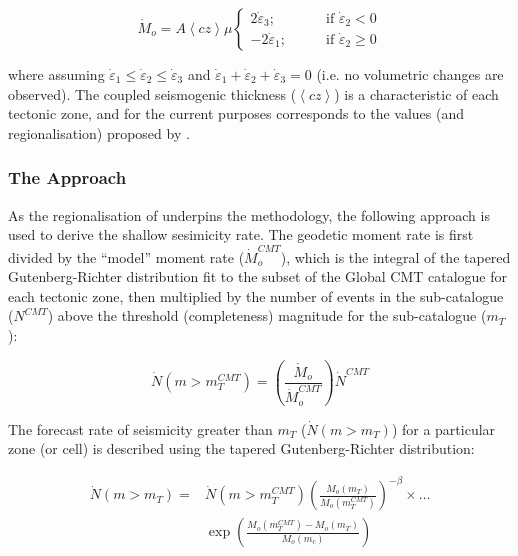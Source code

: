  \begin{equation}
     \dot{M}_o = A \left\langle {cz} \right\rangle \mu \left\{
     \begin{array}{rl}
          2 \dot{\varepsilon}_3;& \qquad \text{if } \dot{\varepsilon}_2 < 0 \\
         -2 \dot{\varepsilon}_1;& \qquad \text{if } \dot{\varepsilon}_2 \geq 0 
     \end{array}
     \right.
 \end{equation}
 
 where assuming $\dot{\varepsilon}_1 \leq \dot{\varepsilon}_2 \leq \dot{\varepsilon}_3$ and $\dot{\varepsilon}_1 + \dot{\varepsilon}_2 + \dot{\varepsilon}_3 = 0$ (i.e. no volumetric changes are observed). The coupled seismogenic thickness ($\left\langle cz \right\rangle$) is a characteristic of each tectonic zone, and for the current purposes corresponds to the values (and regionalisation) proposed by \cite{BirdKagan2004}. 
 
 \subsubsection{The \cite{BirdLiu2007} Approach}
 
 As the regionalisation of \citet{BirdKagan2004} underpins the \cite{BirdLiu2007} methodology, the following approach is used to derive the shallow sesimicity rate. The geodetic moment rate  is first divided by the ``model'' moment rate ($\dot{M}_o^{CMT}$), which is the integral of the tapered Gutenberg-Richter distribution fit to the subset of the Global CMT catalogue for each tectonic zone, then multiplied by the number of events in the sub-catalogue ($N^{CMT}$) above the threshold (completeness) magnitude for the sub-catalogue ($m_T$):
 
 \begin{equation}
 \dot{N} \left( {m > m_T^{CMT}} \right) = \left( {\frac{\dot{M}_o}{\dot{M}_o^{CMT}}} \right) \dot{N}^{CMT}
 \end{equation}

The forecast rate of seismicity greater than $m_T$ ($\dot{N} \left( {m > m_T} \right)$) for a particular zone (or cell) is described using the tapered Gutenberg-Richter distribution:

\begin{equation}
\begin{split}
\dot{N} \left( {m > m_T} \right) =& \dot{N} \left( {m > m_T^{CMT}} \right) \left( {\frac{M_o \left( {m_T} \right)}{M_o \left( {m_T^{CMT}} \right)}} \right)^{-\beta} \times \ldots \\
& \exp \left( {\frac{M_o \left( {m_T^{CMT}} \right) - M_o \left( {m_T} \right)}{M_o \left( {m_c} \right)}} \right)\end{split}
\end{equation}
 

